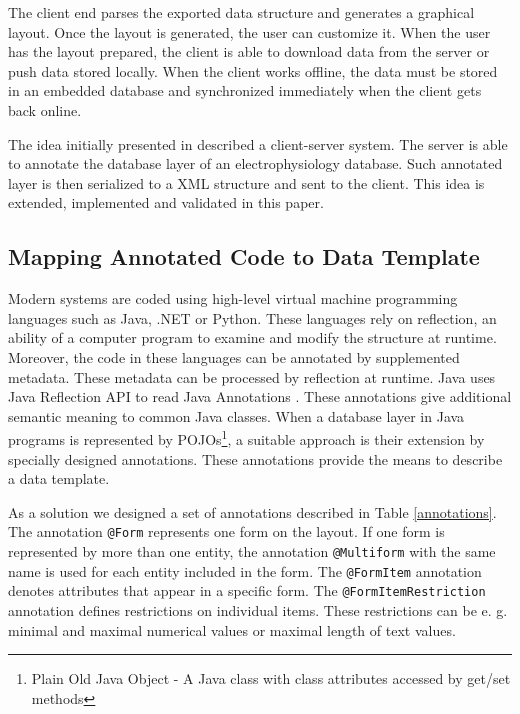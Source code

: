 \documentclass[a4paper,twoside]{article}
\begin{document}
The client end parses the exported data structure and generates a graphical layout. Once the layout is generated, the user can customize it. When the user has the layout prepared, the client is able to download data from the server or push data stored locally. When the client works offline, the data must be stored in an embedded database and synchronized immediately when the client gets back online.



The idea initially presented in \cite{6645264} described a client-server system. The server is able to annotate the database layer of an electrophysiology database. Such annotated layer is then serialized to a XML structure and sent to the client. This idea is extended, implemented and validated in this paper.

\subsection{Mapping Annotated Code to Data Template}\label{Mapping_Code_To_Template}

Modern systems are coded using high-level virtual machine programming languages such as Java, .NET or Python. These languages rely on reflection, an ability of a computer program to examine and modify the structure at runtime. Moreover, the code in these languages can be annotated by supplemented metadata. These metadata can be processed by reflection at runtime. Java uses Java Reflection API \cite{1932394184} to read Java Annotations \cite{AnnotationsJavaDevGuide}. These annotations give additional semantic meaning to common Java classes. When a database layer in Java programs is represented by POJOs\footnote{Plain Old Java Object - A Java class with class attributes accessed by get/set methods}, a suitable approach is their extension by specially designed annotations. These annotations provide the means to describe a data template.

As a solution we designed a set of annotations described in Table \ref{annotations}. The annotation \texttt{@Form} represents one form on the layout. If one form is represented by more than one entity, the annotation \texttt{@Multiform} with the same name is used for each entity included in the form. The \texttt{@FormItem} annotation denotes attributes that appear in a specific form. The \texttt{@FormItemRestriction} annotation defines restrictions on individual items. These restrictions can be e. g. minimal and maximal numerical values or maximal length of text values.
\end{document}
